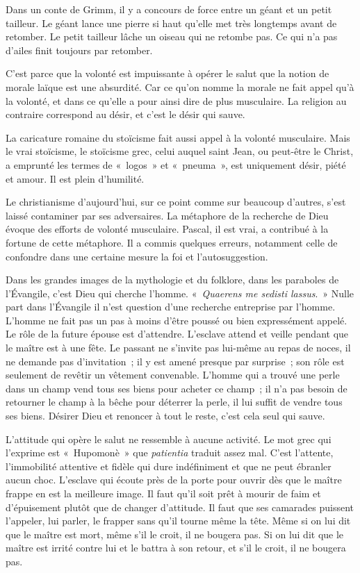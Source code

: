 \documentclass[french,twoside]{book} %
\begin{document}
Dans un conte de Grimm, il y a concours de force entre un géant et un petit tailleur. Le géant lance une pierre si haut qu'elle met très longtemps avant de retomber. Le petit tailleur lâche un oiseau qui ne retombe pas. Ce qui n'a pas d'ailes finit toujours par retomber.\par
C'est parce que la volonté est impuissante à opérer le salut que la notion de morale laïque est une absurdité. Car ce qu'on nomme la morale ne fait appel qu'à la volonté, et dans ce qu'elle a pour ainsi dire de plus musculaire. La religion au contraire correspond au désir, et c'est le désir qui sauve.\par
La caricature romaine du stoïcisme fait aussi appel à la volonté musculaire. Mais le vrai stoïcisme, le stoïcisme grec, celui auquel saint Jean, ou peut-être le Christ, a emprunté les termes de « logos » et « pneuma », est uniquement désir, piété et amour. Il est plein d'humilité.\par
Le christianisme d'aujourd'hui, sur ce point comme sur beaucoup d'autres, s'est laissé contaminer par ses adversaires. La métaphore de la recherche de Dieu évoque des efforts de volonté musculaire. Pascal, il est vrai, a contribué à la fortune de cette métaphore. Il a commis quelques erreurs, notamment celle de confondre dans une certaine mesure la foi et l'autosuggestion.\par
Dans les grandes images de la mythologie et du folklore, dans les paraboles de l'Évangile, c'est Dieu qui cherche l'homme. « {\itshape Quaerens me sedisti lassus}. » Nulle part dans l'Évangile il n'est question d'une recherche entreprise par l'homme. L'homme ne fait pas un pas à moins d'être poussé ou bien expressément appelé. Le rôle de la future épouse est d'attendre. L'esclave attend et veille pendant que le maître est à une fête. Le passant ne s'invite pas lui-même au repas de noces, il ne demande pas d'invitation ; il y est amené presque par surprise ; son rôle est seulement de revêtir un vêtement convenable. L'homme qui a trouvé une perle dans un champ vend tous ses biens pour acheter ce champ ; il n'a pas besoin de retourner le champ à la bêche pour déterrer la perle, il lui suffit de vendre tous ses biens. Désirer Dieu et renoncer à tout le reste, c'est cela seul qui sauve.\par
L'attitude qui opère le salut ne ressemble à aucune activité. Le mot grec qui l'exprime est « Hupomonè » que {\itshape patientia} traduit assez mal. C'est l'attente, l'immobilité attentive et fidèle qui dure indéfiniment et que ne peut ébranler aucun choc. L'esclave qui écoute près de la porte pour ouvrir dès que le maître frappe en est la meilleure image. Il faut qu'il soit prêt à mourir de faim et d'épuisement plutôt que de changer d'attitude. Il faut que ses camarades puissent l'appeler, lui parler, le frapper sans qu'il tourne même la tête. Même si on lui dit que le maître est mort, même s'il le croit, il ne bougera pas. Si on lui dit que le maître est irrité contre lui et le battra à son retour, et s'il le croit, il ne bougera pas.\par
\end{document}
